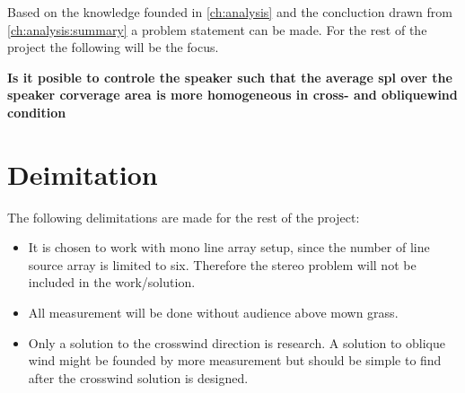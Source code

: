 Based on the knowledge founded in \autoref{ch:analysis} and the concluction drawn from \autoref{ch:analysis:summary} a problem statement can be made. For the rest of the project the following will be the focus.


\textbf{Is it posible to controle the speaker such that the average \gls{spl} over the speaker corverage area is more homogeneous in cross- and obliquewind condition}



\section{Deimitation}
The following delimitations are made for the rest of the project:

\begin{itemize}
\item It is chosen to work with mono line array setup, since the number of line source array is limited to six. Therefore the stereo problem will not be included in the work/solution.
\item All measurement will be done without audience above mown grass. 
\item Only a solution to the crosswind direction is research. A solution to oblique wind might be founded by more measurement but should be simple to find after the crosswind solution is designed.  
\end{itemize}